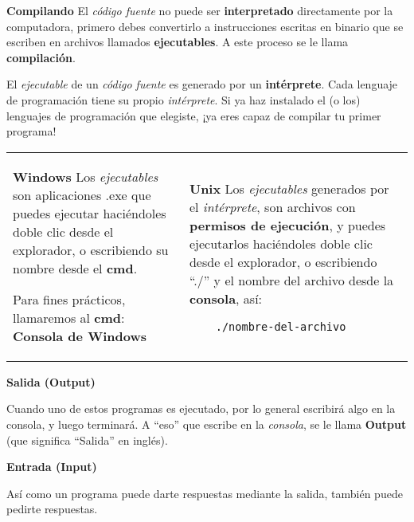 \textbf{Compilando}
El \textit{código fuente} no puede ser \textbf{interpretado} directamente por la computadora, primero debes convertirlo a instrucciones escritas en binario que se escriben en archivos llamados \textbf{ejecutables}. A este proceso se le llama \textbf{compilación}.

El \textit{ejecutable} de un \textit{código fuente} es generado por un \textbf{intérprete}. Cada lenguaje de programación tiene su propio \textit{intérprete}. Si ya haz instalado el (o los) lenguajes de programación que elegiste, ¡ya eres capaz de compilar tu primer programa!

\begin{tabular} {p{8.5cm} p{8.5cm}}
  \textbf{Windows} Los \textit{ejecutables} son aplicaciones .exe que puedes ejecutar haciéndoles doble clic desde el explorador, o escribiendo su nombre desde el \textbf{cmd}.

  Para fines prácticos, llamaremos al \textbf{cmd}: \textbf{Consola de Windows} &

  \textbf{Unix} Los \textit{ejecutables} generados por el \textit{intérprete}, son archivos con \textbf{permisos de ejecución}, y puedes ejecutarlos haciéndoles doble clic desde el explorador, o escribiendo ``./'' y el nombre del archivo desde la \textbf{consola}, así:

  \begin{lstlisting}
    ./nombre-del-archivo
  \end{lstlisting}

\end{tabular}

\textbf{Salida (Output)}

Cuando uno de estos programas es ejecutado, por lo general escribirá algo en la consola, y luego terminará. A ``eso'' que escribe en la \textit{consola}, se le llama \textbf{Output} (que significa ``Salida'' en inglés).


\textbf{Entrada (Input)}

Así como un programa puede darte respuestas mediante la salida, también puede pedirte respuestas. 

